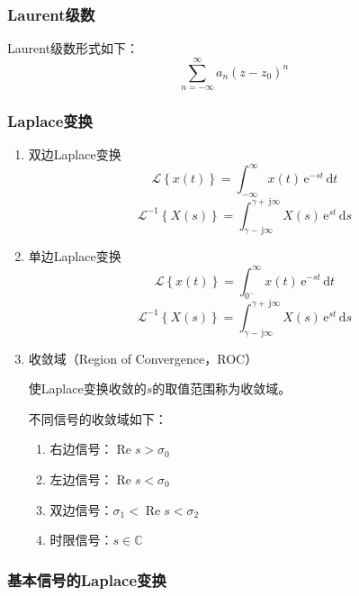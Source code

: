 \documentclass[UTF8,fontset=fandol,zihao=5]{ctexart}
\newcommand{\jj}{\,\mathrm{j}}
\newcommand{\ee}{\,\mathrm{e}}
\newcommand{\CC}{\mathbb{C}}
\newcommand{\dd}{\,\mathrm{d}}
\newcommand{\LL}{\mathcal{L}}
\newcommand{\RRe}{\operatorname{Re}}
\begin{document}
\subsubsection{Laurent级数}

Laurent级数形式如下：
\[
\sum_{n=-\infty}^{\infty} a_n (z-z_0)^n
\]

\subsubsection{Laplace变换}

\begin{enumerate}
  \item 双边Laplace变换
\[
\LL\left\{x(t)\right\}=\int_{-\infty}^{\infty} x(t) \ee^{-s t} \dd t
\]
\[
\LL^{-1}\left\{X(s)\right\}=\int_{\gamma-\jj\infty}^{\gamma+\jj\infty} X(s) \ee^{s t} \dd s
\]

  \item 单边Laplace变换
\[
\LL\left\{x(t)\right\}=\int_{0^-}^{\infty} x(t) \ee^{-s t} \dd t
\]
\[
\LL^{-1}\left\{X(s)\right\}=\int_{\gamma-\jj\infty}^{\gamma+\jj\infty} X(s) \ee^{s t} \dd s
\]

  \item 收敛域（Region of Convergence，ROC）
  
  使Laplace变换收敛的$s$的取值范围称为收敛域。

  不同信号的收敛域如下：
  \begin{enumerate}[label=(\arabic*)]
    \item 右边信号：$\RRe s>\sigma_0$
    \item 左边信号：$\RRe s<\sigma_0$
    \item 双边信号：$\sigma_1<\RRe s<\sigma_2$
    \item 时限信号：$s \in \CC$
  \end{enumerate}
\end{enumerate}

\subsubsection{基本信号的Laplace变换}
\end{document}
